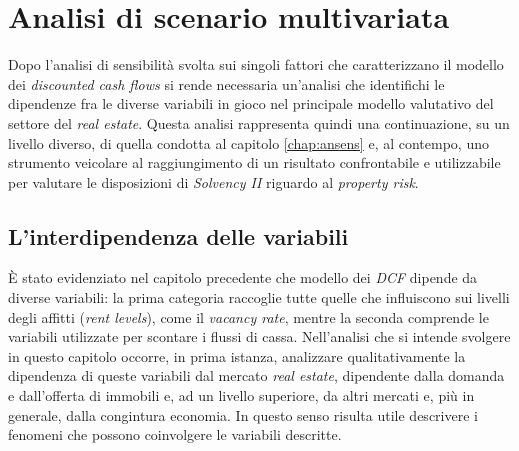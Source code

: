 \chapter{Analisi di scenario multivariata}
Dopo l'analisi di sensibilità svolta sui singoli fattori che caratterizzano il modello dei {\itshape discounted cash flows} si rende necessaria un'analisi che identifichi le dipendenze fra le diverse variabili in gioco nel principale modello valutativo del settore del {\itshape real estate}. Questa analisi rappresenta quindi una continuazione, su un livello diverso, di quella condotta al capitolo \ref{chap:ansens} e, al contempo, uno strumento veicolare al raggiungimento di un risultato confrontabile e utilizzabile per valutare le disposizioni di {\itshape Solvency II} riguardo al {\itshape property risk}.

\section{L'interdipendenza delle variabili}
È stato evidenziato nel capitolo precedente che modello dei \textit{DCF} dipende da diverse variabili: la prima categoria raccoglie tutte quelle che influiscono sui livelli degli affitti ({\itshape rent levels}), come il {\itshape vacancy rate}, mentre la seconda comprende le variabili utilizzate per scontare i flussi di cassa.
Nell'analisi che si intende svolgere in questo capitolo occorre, in prima istanza, analizzare qualitativamente la dipendenza di queste variabili dal mercato {\itshape real estate}, dipendente dalla domanda e dall'offerta di immobili e, ad un livello superiore, da altri mercati e, più in generale, dalla congintura economia.
In questo senso risulta utile descrivere i fenomeni che possono coinvolgere le variabili descritte.

